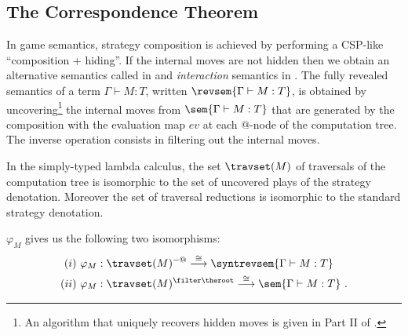 \subsection{The Correspondence Theorem}

In game semantics, strategy composition is achieved by performing a
CSP-like ``composition + hiding''. If the internal moves are not
hidden then we obtain an alternative semantics called
 in \cite{willgreenlandthesis} and
\emph{interaction} semantics in \cite{DBLP:conf/sas/DimovskiGL05}.
The fully revealed semantics of a term $\Gamma \vdash M :T$, written
$\revsem{\Gamma \vdash M : T}$, is obtained by
uncovering\footnote{An algorithm that uniquely recovers hidden moves
is given in Part II of
  \cite{hylandong_pcf}.}  the internal moves from $\sem{\Gamma \vdash
  M : T}$ that are generated by the composition with the evaluation map
$ev$ at each @-node of the computation tree.  The inverse operation
consists in filtering out the internal moves.

In the simply-typed lambda calculus, the set $\travset(M)$ of
traversals of the computation tree is isomorphic to the set of
uncovered plays of the strategy denotation. Moreover the set of
traversal reductions is isomorphic to the standard strategy
denotation.

\begin{theorem}
\label{thm:correspondence} $\varphi_M$ gives us the following two
isomorphisms:
\begin{eqnarray*}
(i)~\varphi_M  &: \travset(M)^{-@} \stackrel{\cong}{\longrightarrow} \syntrevsem{\Gamma \vdash M :T} \\
(ii)~\varphi_M  &: \travset(M )^{\filter \theroot} \stackrel{\cong}{\longrightarrow} \sem{\Gamma \vdash M : T} \ .
\end{eqnarray*}
\end{theorem}

